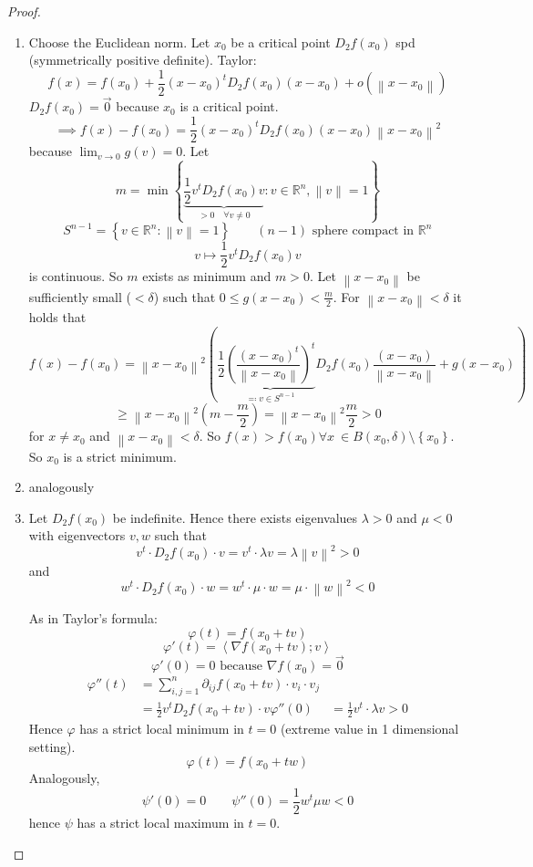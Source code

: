 \documentclass[a4paper,landscape,twocolumn]{article}
\theoremstyle{definition}
\newcommand\set[1]{\left\{#1\right\}}
\newcommand\norm[1]{\left\|#1\right\|}
\begin{document}
\begin{proof}
  \begin{enumerate}
    \item
  Choose the Euclidean norm. Let $x_0$ be a critical point $D_2f(x_0)$ spd (symmetrically positive definite).
  Taylor:
  \[ f(x) = f(x_0) + \frac12 (x - x_0)^t D_2 f(x_0) (x - x_0) + o(\norm{x - x_0}) \]
  $D_2 f(x_0) = \vec{0}$ because $x_0$ is a critical point.
  \[ \implies f(x) - f(x_0) = \frac12 (x - x_0)^t D_2 f(x_0) (x - x_0) \norm{x - x_0}^2 \]
  because $\lim_{v\to 0} g(v) = 0$. Let
  \[ m = \min\set{\underbrace{\frac12 v^t D_2 f(x_0) v}_{>0 \quad \forall v \neq 0}: v \in \mathbb R^n, \norm{v} = 1} \]
  \[ S^{n-1} = \set{v \in \mathbb R^n: \norm{v} = 1} \qquad \text{$(n-1)$ sphere compact in $\mathbb R^n$} \]
  \[ v \mapsto \frac12 v^t D_2 f(x_0) v \]
  is continuous.
  So $m$ exists as minimum and $m > 0$.
  Let $\norm{x - x_0}$ be sufficiently small ($< \delta$) such that $0 \leq g(x - x_0) < \frac{m}{2}$.
  For $\norm{x - x_0} < \delta$ it holds that
  \[ f(x) - f(x_0) = \norm{x - x_0}^2 \left( \frac12
    \underbrace{\left(\frac{(x - x_0)^t}{\norm{x - x_0}}\right)^t}_{\eqqcolon v \in S^{n-1}}
    D_2 f(x_0) \frac{(x - x_0)}{\norm{x - x_0}} + g(x - x_0)
  \right)
  \]
  \[ \geq \norm{x - x_0}^2 (m - \frac{m}{2}) = \norm{x - x_0}^2 \frac{m}{2} > 0 \]
  for $x \neq x_0$ and $\norm{x - x_0} < \delta$.
  So $f(x) > f(x_0) \forall x\ \in B(x_0, \delta) \setminus \set{x_0}$.
  So $x_0$ is a strict minimum.

  \item analogously

  \item
  Let $D_2 f(x_0)$ be indefinite. Hence there exists eigenvalues $\lambda > 0$
  and $\mu < 0$ with eigenvectors $v,w$ such that
  \[ v^t \cdot D_2 f(x_0) \cdot v = v^t \cdot \lambda v = \lambda \norm{v}^2 > 0 \]
  and
  \[ w^t \cdot D_2 f(x_0) \cdot w = w^t \cdot \mu \cdot w = \mu \cdot \norm{w}^2 < 0 \]

  As in Taylor's formula:
  \[ \varphi(t) = f(x_0 + tv) \]
  \[ \varphi'(t) = \left\langle \nabla f(x_0 + tv); v\right\rangle \]
  \[ \varphi'(0) = 0 \text{ because } \nabla f(x_0) = \vec{0} \]
  \begin{align*}
    \varphi''(t) &= \sum_{i,j=1}^n \partial_{ij} f(x_0 + tv) \cdot v_i \cdot v_j \\
    &= \frac12 v^t D_2 f(x_0 + tv) \cdot v
    \varphi''(0) &= \frac12 v^t \cdot \lambda v > 0
  \end{align*}
  Hence $\varphi$ has a strict local minimum in $t=0$ (extreme value in 1 dimensional setting).
  \[ \varphi(t) = f(x_0 + tw) \]
  Analogously,
  \[ \psi'(0) = 0 \qquad \psi''(0) = \frac12 w^t \mu w < 0 \]
  hence $\psi$ has a strict local maximum in $t=0$.


\end{enumerate}
\end{proof}
\end{document}
